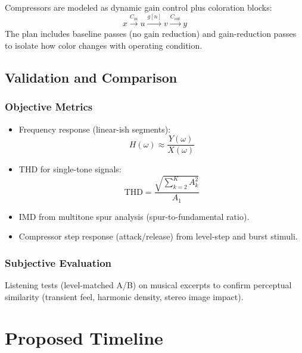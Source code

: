 \documentclass[11pt, letterpaper]{article}
\begin{document}
Compressors are modeled as dynamic gain control plus coloration blocks:
\begin{equation}
    x \xrightarrow{C_\text{in}} u \xrightarrow{g[n]} v \xrightarrow{C_\text{out}} y
\end{equation}
The plan includes baseline passes (no gain reduction) and gain-reduction passes to isolate how color
changes with operating condition.

\subsection{Validation and Comparison}

\subsubsection*{Objective Metrics}
\begin{itemize}[leftmargin=1.5em]
    \item Frequency response (linear-ish segments):
          \begin{equation}
              H(\omega) \approx \frac{Y(\omega)}{X(\omega)}
          \end{equation}
    \item THD for single-tone signals:
          \begin{equation}
              \text{THD} = \frac{\sqrt{\sum_{k=2}^{K} A_k^2}}{A_1}
          \end{equation}
    \item IMD from multitone spur analysis (spur-to-fundamental ratio).
    \item Compressor step response (attack/release) from level-step and burst stimuli.
\end{itemize}

\subsubsection*{Subjective Evaluation}
Listening tests (level-matched A/B) on musical excerpts to confirm perceptual similarity (transient
feel, harmonic density, stereo image impact).

\section{Proposed Timeline}
\label{sec:timeline}
\end{document}
